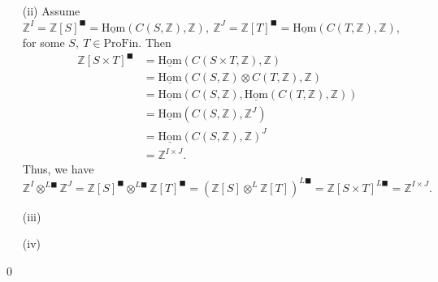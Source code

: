 \documentclass[UTF8,12,a4paper]{ctexart}
\theoremstyle{definition}
\begin{document}
\begin{itemize}
	\item [(ii)] Assume $\mathbb{Z}^I=\mathbb{Z}[S]^\blacksquare=\underline{\text{Hom}}(C(S,\mathbb{Z}),\mathbb{Z}),\  \mathbb{Z}^J=\mathbb{Z}[T]^\blacksquare=\underline{\text{Hom}}(C(T,\mathbb{Z}),\mathbb{Z})$, for some $S,\ T\in \text{ProFin}.$ 
	Then
	\begin{align*}
	\mathbb{Z}[S\times T]^{\blacksquare}
	&=\underline{\text{Hom}}(C(S\times T,\mathbb{Z}),\mathbb{Z})\\
	&=\underline{\text{Hom}}(C(S,\mathbb{Z})\otimes C(T,\mathbb{Z}),\mathbb{Z})\\
	&=\underline{\text{Hom}}(C(S,\mathbb{Z}),\underline{\text{Hom}}( C(T,\mathbb{Z}),\mathbb{Z}))\\
	&=\underline{\text{Hom}}(C(S,\mathbb{Z}),\mathbb{Z}^J)\\
	&=\underline{\text{Hom}}(C(S,\mathbb{Z}),\mathbb{Z})^J\\
	&=\mathbb{Z}^{I\times J}.
	\end{align*}
	Thus, we have
	$$
	\mathbb{Z}^I\otimes^{L\blacksquare} \mathbb{Z}^J=\mathbb{Z}[S]^\blacksquare\otimes^{L\blacksquare}\mathbb{Z}[T]^\blacksquare=(\mathbb{Z}[S]\otimes^{L}\mathbb{Z}[T])^{L\blacksquare}=\mathbb{Z}[S\times T]^{L\blacksquare}=\mathbb{Z}^{I\times J}.
	$$
	\item [(iii)]
	\item [(iv)]
\end{itemize}
\qed






	
\end{document}
